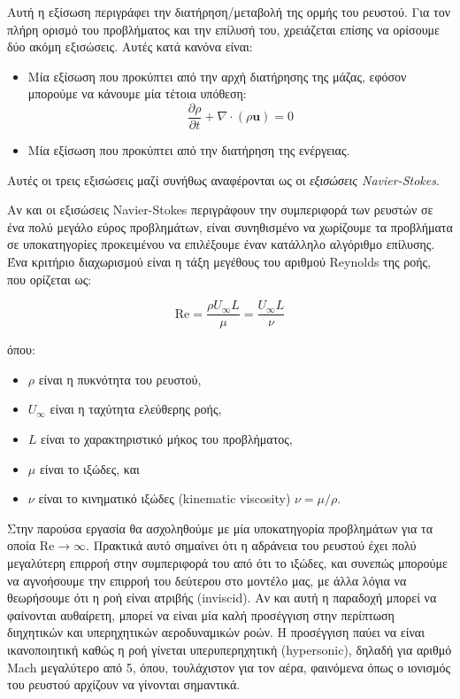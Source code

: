 Αυτή η εξίσωση περιγράφει την διατήρηση/μεταβολή της ορμής του ρευστού.
Για τον πλήρη ορισμό του προβλήματος και την επίλυσή του, χρειάζεται επίσης να ορίσουμε δύο ακόμη εξισώσεις.
Αυτές κατά κανόνα είναι:

\begin{itemize}
    \item Μία εξίσωση που προκύπτει από την αρχή διατήρησης της μάζας, εφόσον μπορούμε να κάνουμε μία τέτοια υπόθεση:
        \begin{equation*}
            \frac{\partial \rho}{\partial t} + \nabla \cdot \left( \rho \mathbf{u} \right) = 0
        \end{equation*}
    \item Μία εξίσωση που προκύπτει από την διατήρηση της ενέργειας.
\end{itemize}

Αυτές οι τρεις εξισώσεις μαζί συνήθως αναφέρονται ως οι \emph{εξισώσεις Navier-Stokes}.

Αν και οι εξισώσεις Navier-Stokes περιγράφουν την συμπεριφορά των ρευστών σε ένα πολύ μεγάλο εύρος προβλημάτων, είναι συνηθισμένο να χωρίζουμε τα προβλήματα σε υποκατηγορίες προκειμένου να επιλέξουμε έναν κατάλληλο αλγόριθμο επίλυσης.
Ένα κριτήριο διαχωρισμού είναι η τάξη μεγέθους του αριθμού Reynolds της ροής, που ορίζεται ως:

\begin{equation*}
    \mathrm{Re} = \frac{\rho U_{\infty} L}{\mu} = \frac{U_\infty L}{\nu}
\end{equation*}

όπου:

\begin{itemize}
    \item $\rho$ είναι η πυκνότητα του ρευστού,
    \item $U_{\infty}$ είναι η ταχύτητα ελεύθερης ροής,
    \item $L$ είναι το χαρακτηριστικό μήκος του προβλήματος,
    \item $\mu$ είναι το ιξώδες, και
    \item $\nu$ είναι το κινηματικό ιξώδες (kinematic viscosity) $\nu = \mu / \rho$.
\end{itemize}

Στην παρούσα εργασία θα ασχοληθούμε με μία υποκατηγορία προβλημάτων για τα οποία $\mathrm{Re} \to \infty$.
Πρακτικά αυτό σημαίνει ότι η αδράνεια του ρευστού έχει πολύ μεγαλύτερη επιρροή στην συμπεριφορά του από ότι το ιξώδες, και συνεπώς μπορούμε να αγνοήσουμε την επιρροή του δεύτερου στο μοντέλο μας, με άλλα λόγια να θεωρήσουμε ότι η ροή είναι ατριβής (inviscid).
Αν και αυτή η παραδοχή μπορεί να φαίνονται αυθαίρετη, μπορεί να είναι μία καλή προσέγγιση στην περίπτωση διηχητικών και υπερηχητικών αεροδυναμικών ροών.
Η προσέγγιση παύει να είναι ικανοποιητική καθώς η ροή γίνεται υπερυπερηχητική (hypersonic), δηλαδή για αριθμό Mach μεγαλύτερο από 5, όπου, τουλάχιστον για τον αέρα, φαινόμενα όπως ο ιονισμός του ρευστού αρχίζουν να γίνονται σημαντικά.

